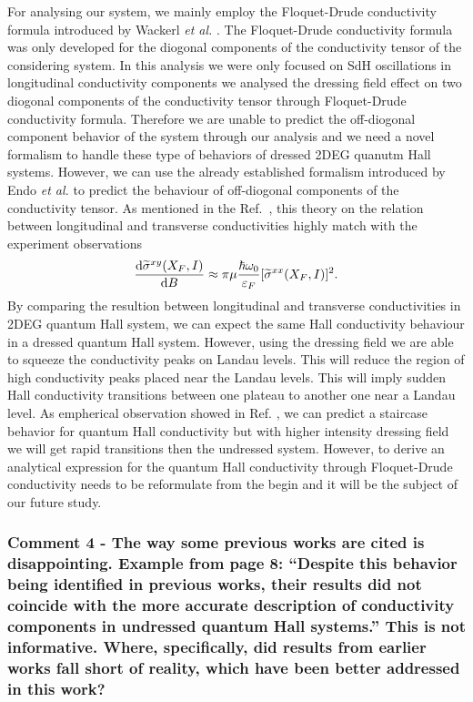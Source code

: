 \documentclass{article}
\begin{document}
For analysing our system, we mainly employ the Floquet-Drude conductivity formula introduced by Wackerl \textit{et al.} \cite{wackerl20}. The Floquet-Drude conductivity formula was only developed for the diogonal components of the conductivity tensor of the considering system. In this analysis we were only focused on SdH oscillations in longitudinal conductivity components we analysed the dressing field effect on two diogonal components of the conductivity tensor through Floquet-Drude conductivity formula. Therefore we are unable to predict the off-diogonal component behavior of the system through our analysis and we need a novel formalism to handle these type of behaviors of dressed 2DEG quanutm Hall systems. However, we can use the already established formalism introduced by Endo \textit{et al.} \cite{endo09} to predict the behaviour of off-diogonal components of the conductivity tensor. As mentioned in the Ref.~\cite{endo09}, this theory on the relation between longitudinal and transverse conductivities highly match with the experiment observations
\begin{equation} \nonumber
  \dv{\widetilde{\sigma}^{xy}(X_F,I)}{B} \approx
    \pi\mu \frac{\hbar \omega_0}{\varepsilon_F} [\widetilde{\sigma}^{xx}(X_F,I)]^2.
\end{equation}
By comparing the resultion between longitudinal and transverse conductivities in 2DEG quantum Hall system, we can expect the same Hall conductivity behaviour in a dressed quantum Hall system. However, using the dressing field we are able to squeeze the conductivity peaks on Landau levels. This will reduce the region of high conductivity peaks placed near the Landau levels. This will imply sudden Hall conductivity transitions between one plateau to another one near a Landau level. As empherical observation showed in Ref. \cite{klitzing80,gusynin06}, we can predict a staircase behavior for quantum Hall conductivity but with higher intensity dressing field we will get rapid transitions then the undressed system. However, to derive an analytical expression for the quantum Hall conductivity through Floquet-Drude conductivity needs to be reformulate from the begin and it will be the subject of our future study.

\subsubsection*{Comment 4 -
\color{RoyalBlue} The way some previous works are cited is disappointing. Example from page 8: “Despite this behavior being identified in previous works, their results did not coincide with the more accurate description of conductivity components in undressed quantum Hall systems.” This is not informative. Where, specifically, did results from earlier works fall short of reality, which have been better addressed in this work?
}
\end{document}
